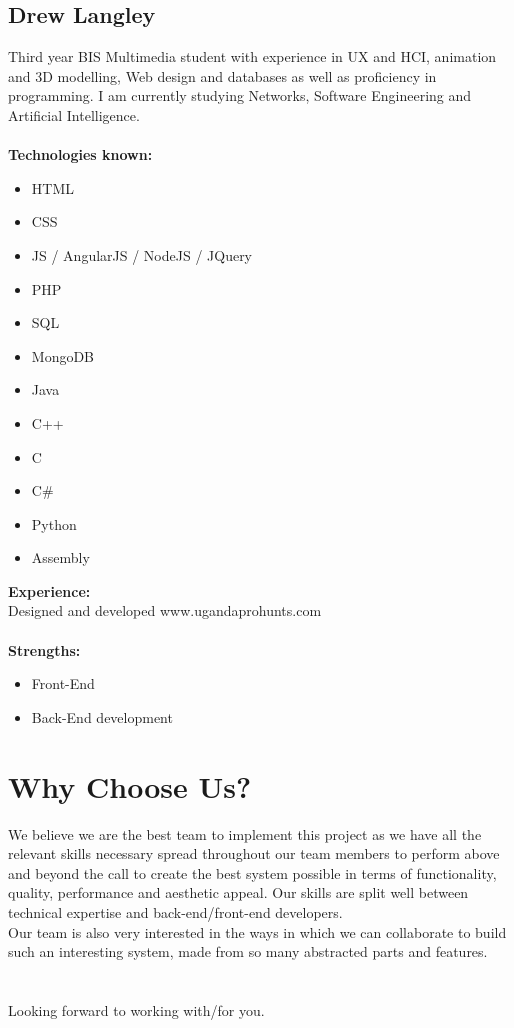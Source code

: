 \documentclass{article}
\begin{document}
\subsection {Drew Langley}
Third year BIS Multimedia student with experience in UX and HCI, animation and 3D modelling, Web design and databases as well as proficiency in programming. I am currently studying Networks, Software Engineering and Artificial Intelligence. \\ \\
\textbf{Technologies known:}
\begin{itemize}
	\item HTML
	\item CSS 
	\item JS / AngularJS / NodeJS / JQuery 
	\item PHP 
	\item SQL
	\item MongoDB
	\item Java 
	\item C++ 
	\item C 
	\item C\# 
	\item Python 
	\item Assembly
\end{itemize}
\textbf{Experience:} \\
Designed and developed www.ugandaprohunts.com
\\ \\
\textbf{Strengths:} 
\begin{itemize}
	\item Front-End
	\item Back-End development
\end{itemize}

\newpage
\section{Why Choose Us?}
	We believe we are the best team to implement this project as we have all the relevant skills necessary spread throughout our team members to perform above and beyond the call to create the best system possible in terms of functionality, quality, performance and aesthetic appeal. Our skills are split well between technical expertise and back-end/front-end developers.\\
	Our team is also very interested in the ways in which we can collaborate to build such an interesting system, made from so many abstracted parts and features.\\
	
	\\ \\
	Looking forward to working with/for you.
\end{document}
